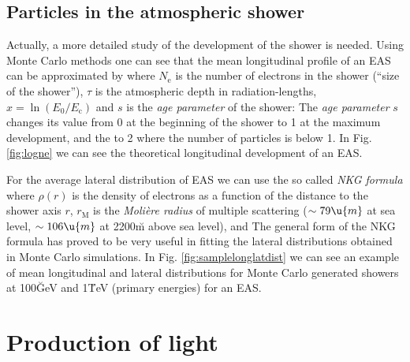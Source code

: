 \lognefig

\subsection{Particles in the atmospheric shower}

Actually, a more detailed study of the development of the shower is
needed. Using Monte Carlo methods one can see that the mean
longitudinal profile of an EAS can be approximated by
%
\Neeq
%
where $N_{\mathrm{e}}$ is the number of electrons in the shower
(``size of the shower''), $\tau$ is the atmospheric depth in
radiation-lengths, $x=\ln(E_0/E_{\mathrm{c}})$ and $s$ is the
\emph{age parameter} of the shower:
%
\ageeq
%
The \emph{age parameter} $s$ changes its value from 0 at the
beginning of the shower to 1 at the maximum development, and the to 2
where the number of particles is below 1. In Fig. \ref{fig:logne} we
can see the theoretical longitudinal development of an EAS.

\samplelonglatdistfig

For the average lateral distribution of EAS we can use the so called
\emph{NKG formula}
%
\NKGeq
%
where $\rho(r)$ is the density of electrons as a function of the
distance to the shower axis $r$, $r_{\mathrm{M}}$ is the
\emph{Moli\`ere radius} of multiple scattering ($\sim 79\u{m}$ at sea
level, $\sim 106\u{m}$ at 2200\u{m} above sea level), and
%
\fsreq
%
The general form of the NKG formula has proved to be very useful in
fitting the lateral distributions obtained in Monte Carlo
simulations. In Fig. \ref{fig:samplelonglatdist} we can see an example of
mean longitudinal and lateral distributions for Monte Carlo generated
showers at 100\u{GeV} and 1\u{TeV} (primary energies) for an EAS.

\section{Production of \Cherenkov light}

